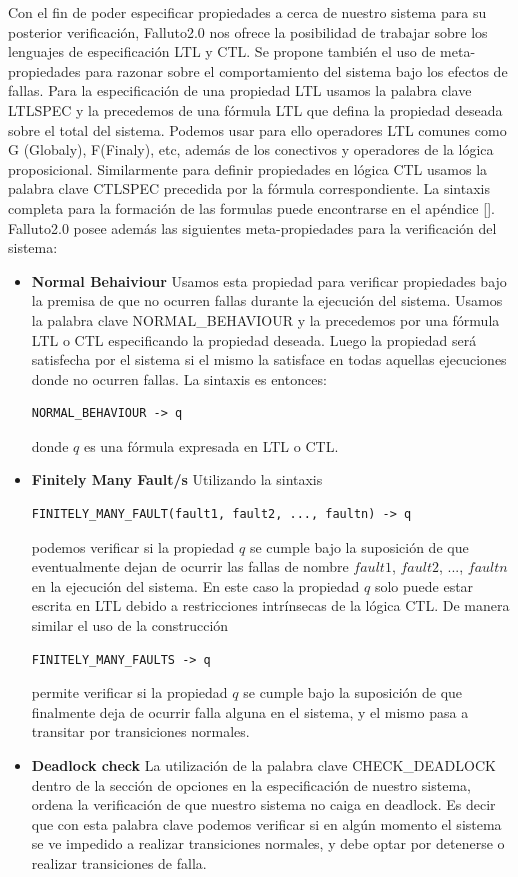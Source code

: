 \documentclass[titlepage, 12pt]{book}
\begin{document}
Con el fin de poder especificar propiedades a cerca de nuestro sistema para su posterior verificaci\'on, Falluto2.0 nos ofrece la posibilidad de trabajar sobre los lenguajes de especificaci\'on LTL y CTL. Se propone tambi\'en el uso de meta-propiedades para razonar sobre el comportamiento del sistema bajo los efectos de fallas.
Para la especificaci\'on de una propiedad LTL usamos la palabra clave LTLSPEC y la precedemos de una f\'ormula LTL que defina la propiedad deseada sobre el total del sistema. Podemos usar para ello operadores LTL comunes como G (Globaly), F(Finaly), etc, adem\'as de los conectivos y operadores de la l\'ogica proposicional. Similarmente para definir propiedades en l\'ogica CTL usamos la palabra clave CTLSPEC precedida por la f\'ormula correspondiente. La sintaxis completa para la formaci\'on de las formulas puede encontrarse en el ap\'endice \ref{}.\\
Falluto2.0 posee adem\'as las siguientes meta-propiedades para la verificaci\'on del sistema:
\begin{itemize}
\item \textbf{Normal Behaiviour} Usamos esta propiedad para verificar propiedades bajo la premisa de que no ocurren fallas durante la ejecuci\'on del sistema. Usamos la palabra clave NORMAL\_BEHAVIOUR y la precedemos por una f\'ormula LTL o CTL especificando la propiedad deseada. Luego la propiedad ser\'a satisfecha por el sistema si el mismo la satisface en todas aquellas ejecuciones donde no ocurren fallas. La sintaxis es entonces: \begin{verbatim}NORMAL_BEHAVIOUR -> q \end{verbatim} donde $q$ es una f\'ormula expresada en LTL o CTL.
\item \textbf{Finitely Many Fault/s} Utilizando la sintaxis \begin{verbatim}FINITELY_MANY_FAULT(fault1, fault2, ..., faultn) -> q\end{verbatim} podemos verificar si la propiedad $q$ se cumple bajo la suposici\'on de que eventualmente dejan de ocurrir las fallas de nombre $fault1$, $fault2$, ..., $faultn$ en la ejecuci\'on del sistema. En este caso la propiedad $q$ solo puede estar escrita en LTL debido a restricciones intr\'insecas de la l\'ogica CTL. De manera similar el uso de la construcci\'on \begin{verbatim}FINITELY_MANY_FAULTS -> q \end{verbatim} permite verificar si la propiedad $q$ se cumple bajo la suposici\'on de que finalmente deja de ocurrir falla alguna en el sistema, y el mismo pasa a transitar por transiciones normales.
\item \textbf{Deadlock check} La utilizaci\'on de la palabra clave CHECK\_DEADLOCK dentro de la secci\'on de opciones en la especificaci\'on de nuestro sistema, ordena la verificaci\'on de que nuestro sistema no caiga en deadlock. Es decir que con esta palabra clave podemos verificar si en alg\'un momento el sistema se ve impedido a realizar transiciones normales, y debe optar por detenerse o realizar transiciones de falla.
\end{itemize}
\end{document}

